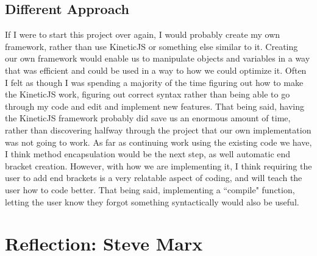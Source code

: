 \documentclass[a4paper]{article}
\begin{document}
\subsection{Different Approach}
If I were to start this project over again, I would probably create my own framework, rather than use KineticJS or something else similar to it. Creating our own framework would enable us to manipulate objects and variables in a way that was efficient and could be used in a way to how we could optimize it. Often I felt as though I was spending a majority of the time figuring out how to make the KineticJS work, figuring out correct syntax rather than being able to go through my code and edit and implement new features. That being said, having the KineticJS framework probably did save us an enormous amount of time, rather than discovering halfway through the project that our own implementation was not going to work. As far as continuing work using the existing code we have, I think method encapsulation would be the next step, as well automatic end bracket creation. However, with how we are implementing it, I think requiring the user to add end brackets is a very relatable aspect of coding, and will teach the user how to code better. That being said, implementing a ``compile" function, letting the user know they forgot something syntactically would also be useful.
\section{Reflection: Steve Marx}
\end{document}
